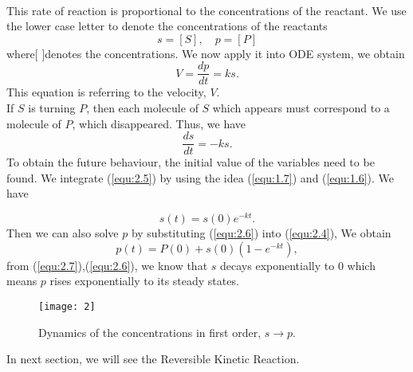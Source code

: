 \documentclass[a4paper]{report}
\theoremstyle{definition}
\begin{document}
\medskip
\\This rate of reaction is proportional to the concentrations of the reactant. We use the lower case letter to denote the concentrations of the reactants
\begin{equation}
\label{equ:2.3}
s=[S], 
\quad p=[P]
\end{equation}
where$[$   $]$denotes the concentrations.
\medskip
We now apply it into ODE system, we obtain
\begin{equation}
\label{equ:2.4}
V=\dfrac{dp}{dt}=ks.
\end{equation}
This equation is referring to the velocity, $V$.
\\If $S$ is turning $P$, then each molecule of $S$ which appears must correspond to a molecule of $P$, which disappeared. Thus, we have
\begin{equation}
\label{equ:2.5}
\dfrac{ds}{dt}=-ks.
\end{equation} 
To obtain the future behaviour, the initial value of the variables need to be found. We integrate (\ref{equ:2.5}) by using the idea (\ref{equ:1.7}) and (\ref{equ:1.6}). We have

\begin{equation}
\label{equ:2.6}
s(t)=s(0)e^{-kt}.
\end{equation}
Then we can also solve $p$ by substituting (\ref{equ:2.6}) into (\ref{equ:2.4}), We obtain
\begin{equation}
\label{equ:2.7}
p(t)=P(0)+s(0)(1-e^{-kt}),
\end{equation}
from (\ref{equ:2.7}),(\ref{equ:2.6}), we know that $s$ decays exponentially to $0$ which means $p$ rises exponentially to its steady states.
\begin{figure}[H]
\texttt{[image: 2]}
\caption{Dynamics of the concentrations in first order, ${s{\rightarrow}p}$.}
\label{fig1.2}
\end{figure}
\medskip
In next section, we will see the Reversible Kinetic Reaction.
\end{document}
